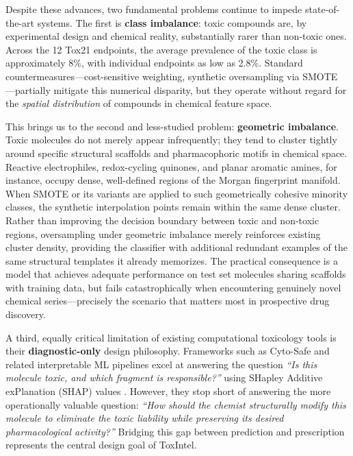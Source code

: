 \documentclass[lettersize,journal]{IEEEtran}
\begin{document}
Despite these advances, two fundamental problems continue to impede
state-of-the-art systems.
The first is \textbf{class imbalance}: toxic compounds are, by experimental
design and chemical reality, substantially rarer than non-toxic ones.
Across the 12 Tox21 endpoints, the average prevalence of the toxic class is
approximately 8\%, with individual endpoints as low as 2.8\%.
Standard countermeasures---cost-sensitive weighting, synthetic oversampling via
SMOTE \cite{barua}---partially mitigate this numerical disparity, but they
operate without regard for the \textit{spatial distribution} of compounds in
chemical feature space.

This brings us to the second and less-studied problem:
\textbf{geometric imbalance}.
Toxic molecules do not merely appear infrequently; they tend to cluster tightly
around specific structural scaffolds and pharmacophoric motifs in chemical
space.
Reactive electrophiles, redox-cycling quinones, and planar aromatic amines, for
instance, occupy dense, well-defined regions of the Morgan fingerprint manifold.
When SMOTE or its variants are applied to such geometrically cohesive minority
classes, the synthetic interpolation points remain within the same dense cluster.
Rather than improving the decision boundary between toxic and non-toxic regions,
oversampling under geometric imbalance merely reinforces existing cluster
density, providing the classifier with additional redundant examples of the same
structural templates it already memorizes.
The practical consequence is a model that achieves adequate performance on
test set molecules sharing scaffolds with training data, but fails
catastrophically when encountering genuinely novel chemical series---precisely
the scenario that matters most in prospective drug discovery.

A third, equally critical limitation of existing computational toxicology tools
is their \textbf{diagnostic-only} design philosophy.
Frameworks such as Cyto-Safe \cite{feitosa} and related interpretable ML
pipelines excel at answering the question \textit{``Is this molecule toxic, and
which fragment is responsible?''} using SHapley Additive exPlanation (SHAP)
values \cite{lundberg2017}.
However, they stop short of answering the more operationally valuable question:
\textit{``How should the chemist structurally modify this molecule to eliminate
the toxic liability while preserving its desired pharmacological activity?''}
Bridging this gap between prediction and prescription represents the central
design goal of ToxIntel.
\end{document}
